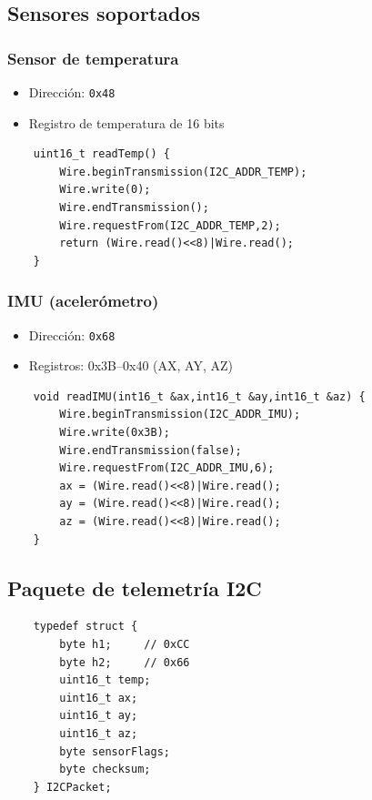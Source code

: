 \documentclass[12pt,a4paper]{article}
\begin{document}
\subsection{Sensores soportados}

\subsubsection{Sensor de temperatura}

\begin{itemize}
	\item Dirección: \texttt{0x48}
	\item Registro de temperatura de 16 bits
\end{itemize}

\begin{lstlisting}
	uint16_t readTemp() {
		Wire.beginTransmission(I2C_ADDR_TEMP);
		Wire.write(0);
		Wire.endTransmission();
		Wire.requestFrom(I2C_ADDR_TEMP,2);
		return (Wire.read()<<8)|Wire.read();
	}
\end{lstlisting}

\subsubsection{IMU (acelerómetro)}

\begin{itemize}
	\item Dirección: \texttt{0x68}
	\item Registros: 0x3B–0x40 (AX, AY, AZ)
\end{itemize}

\begin{lstlisting}
	void readIMU(int16_t &ax,int16_t &ay,int16_t &az) {
		Wire.beginTransmission(I2C_ADDR_IMU);
		Wire.write(0x3B);
		Wire.endTransmission(false);
		Wire.requestFrom(I2C_ADDR_IMU,6);
		ax = (Wire.read()<<8)|Wire.read();
		ay = (Wire.read()<<8)|Wire.read();
		az = (Wire.read()<<8)|Wire.read();
	}
\end{lstlisting}

\subsection{Paquete de telemetría I2C}

\begin{lstlisting}
	typedef struct {
		byte h1;     // 0xCC
		byte h2;     // 0x66
		uint16_t temp;
		uint16_t ax;
		uint16_t ay;
		uint16_t az;
		byte sensorFlags;
		byte checksum;
	} I2CPacket;
\end{lstlisting}
\end{document}
